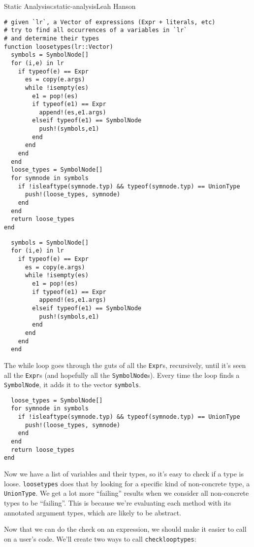 \begin{aosachapter}{Static Analysis}{s:static-analysis}{Leah Hanson}
\begin{verbatim}
# given `lr`, a Vector of expressions (Expr + literals, etc)
# try to find all occurrences of a variables in `lr`
# and determine their types
function loosetypes(lr::Vector)
  symbols = SymbolNode[]
  for (i,e) in lr
    if typeof(e) == Expr
      es = copy(e.args)
      while !isempty(es)
        e1 = pop!(es)
        if typeof(e1) == Expr
          append!(es,e1.args)
        elseif typeof(e1) == SymbolNode
          push!(symbols,e1)
        end
      end
    end
  end
  loose_types = SymbolNode[]
  for symnode in symbols
    if !isleaftype(symnode.typ) && typeof(symnode.typ) == UnionType
      push!(loose_types, symnode)
    end
  end
  return loose_types
end
\end{verbatim}

\begin{verbatim}
  symbols = SymbolNode[]
  for (i,e) in lr
    if typeof(e) == Expr
      es = copy(e.args)
      while !isempty(es)
        e1 = pop!(es)
        if typeof(e1) == Expr
          append!(es,e1.args)
        elseif typeof(e1) == SymbolNode
          push!(symbols,e1)
        end
      end
    end
  end
\end{verbatim}

The while loop goes through the guts of all the \texttt{Expr}s,
recursively, until it's seen all the \texttt{Expr}s (and hopefully all
the \texttt{SymbolNode}s). Every time the loop finds a
\texttt{SymbolNode}, it adds it to the vector \texttt{symbols}.

\begin{verbatim}
  loose_types = SymbolNode[]
  for symnode in symbols
    if !isleaftype(symnode.typ) && typeof(symnode.typ) == UnionType
      push!(loose_types, symnode)
    end
  end
  return loose_types
end
\end{verbatim}

Now we have a list of variables and their types, so it's easy to check
if a type is loose. \texttt{loosetypes} does that by looking for a
specific kind of non-concrete type, a \texttt{UnionType}. We get a lot
more ``failing'' results when we consider all non-concrete types to be
``failing''. This is because we're evaluating each method with its
annotated argument types, which are likely to be abstract.

\label{making-this-usable}

Now that we can do the check on an expression, we should make it easier
to call on a user's code. We'll create two ways to call
\texttt{checklooptypes}:


\end{aosachapter}
